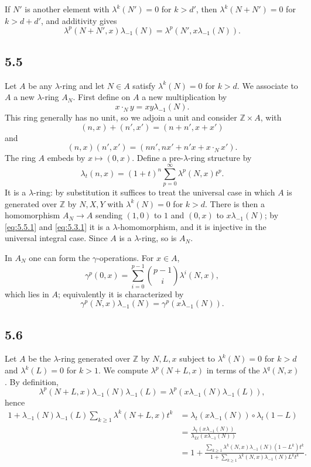 \documentclass[11pt]{article}
\theoremstyle{plain}
\theoremstyle{definition}
\theoremstyle{remark}
\newcommand{\ZZ}{\mathbb Z}
\begin{document}
If $N'$ is another element with $\lambda^k(N')=0$ for $k>d'$, then $\lambda^k(N+N')=0$ for $k>d+d'$, and additivity gives
\begin{equation}\label{eq:5.4.2}
\lambda^p(N+N',x)\lambda_{-1}(N)=\lambda^p(N',x\lambda_{-1}(N)).
\end{equation}

\subsection*{5.5}
Let $A$ be any $\lambda$-ring and let $N\in A$ satisfy $\lambda^k(N)=0$ for $k>d$. We associate to $A$ a new $\lambda$-ring $A_N$. First define on $A$ a new multiplication by
\begin{equation}\label{eq:5.5.1}
x\cdot_N y=xy\lambda_{-1}(N).
\end{equation}
This ring generally has no unit, so we adjoin a unit and consider $\ZZ\times A$, with
\[
(n,x)+(n',x')=(n+n',x+x')
\]
and
\begin{equation}\label{eq:5.5.2}
(n,x)(n',x')=(nn',nx'+n'x+x\cdot_N x').
\end{equation}
The ring $A$ embeds by $x\mapsto(0,x)$. Define a pre-$\lambda$-ring structure by
\begin{equation}\label{eq:5.5.3}
\lambda_t(n,x)=(1+t)^n\sum_{p=0}^{\infty}\lambda^p(N,x)t^p.
\end{equation}
It is a $\lambda$-ring: by substitution it suffices to treat the universal case in which $A$ is generated over $\ZZ$ by $N,X,Y$ with $\lambda^k(N)=0$ for $k>d$. There is then a homomorphism $A_N\to A$ sending $(1,0)$ to $1$ and $(0,x)$ to $x\lambda_{-1}(N)$; by \eqref{eq:5.5.1} and \eqref{eq:5.3.1} it is a $\lambda$-homomorphism, and it is injective in the universal integral case. Since $A$ is a $\lambda$-ring, so is $A_N$.

In $A_N$ one can form the $\gamma$-operations. For $x\in A$,
\[
\gamma^p(0,x)=\sum_{i=0}^{p-1}\binom{p-1}{i}\lambda^i(N,x),
\]
which lies in $A$; equivalently it is characterized by
\begin{equation}\label{eq:5.5.4}
\gamma^p(N,x)\lambda_{-1}(N)=\gamma^p(x\lambda_{-1}(N)).
\end{equation}

\subsection*{5.6}
Let $A$ be the $\lambda$-ring generated over $\ZZ$ by $N,L,x$ subject to $\lambda^k(N)=0$ for $k>d$ and $\lambda^k(L)=0$ for $k>1$. We compute $\lambda^p(N+L,x)$ in terms of the $\lambda^q(N,x)$. By definition,
\[
\lambda^p(N+L,x)\lambda_{-1}(N)\lambda_{-1}(L)=\lambda^p(x\lambda_{-1}(N)\lambda_{-1}(L)),
\]
hence
\begin{align*}
1+\lambda_{-1}(N)\lambda_{-1}(L)\sum_{k\geq 1}\lambda^k(N+L,x)t^k
&=\lambda_t(x\lambda_{-1}(N))\circ\lambda_t(1-L)\\
&=\frac{\lambda_t(x\lambda_{-1}(N))}{\lambda_{Lt}(x\lambda_{-1}(N))}\\
&=1+\frac{\sum_{k\geq 1}\lambda^k(N,x)\lambda_{-1}(N)(1-L^k)t^k}{1+\sum_{k\geq 1}\lambda^k(N,x)\lambda_{-1}(N)L^kt^k}.
\end{align*}
\end{document}
